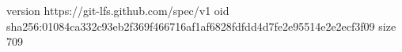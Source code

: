 version https://git-lfs.github.com/spec/v1
oid sha256:01084ca332c93eb2f369f466716af1af6828fdfdd4d7fe2e95514e2e2ecf3f09
size 709

